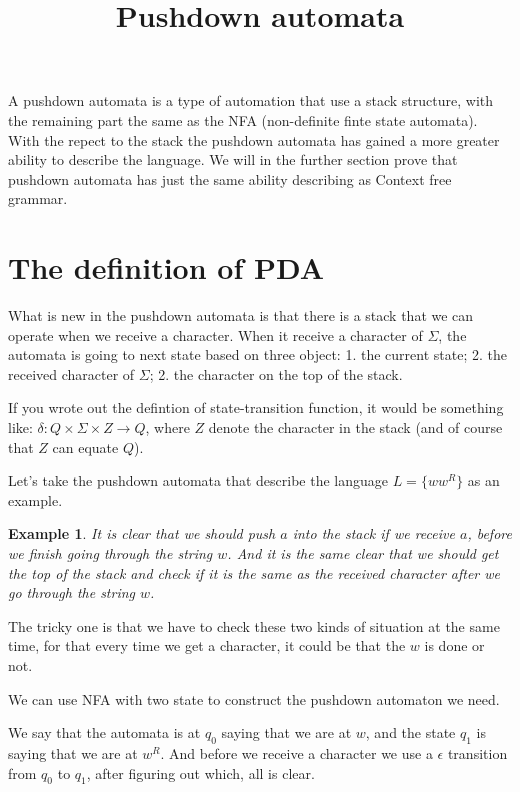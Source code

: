 \documentclass[12pt]{article}
\theoremstyle{definition}
\newtheorem{exam}[definition]{Example}
\theoremstyle{remark}
\begin{document}
\title{Pushdown automata}
\maketitle
A pushdown automata is a type of automation that use a stack structure, with the remaining part the same as the NFA (non-definite finte state automata). With the repect to the stack the pushdown automata has gained a more greater ability to describe the language. We will in the further section prove that pushdown automata has just the same ability describing as Context free grammar.

\section{The definition of PDA}
\label{sec:The definition of PDA}

What is new in the pushdown automata is that there is a stack that we can operate when we receive a character.
When it receive a character of \( \Sigma\), the automata is going to next state based on three object: 1. the current state; 2. the received character of \( \Sigma\); 2. the character on the top of the stack.

If you wrote out the defintion of state-transition function, it would be something like: \(\delta \colon Q \times \Sigma \times Z \to Q\), where \(Z\) denote the character in the stack (and of course that \(Z\) can equate \(Q\)).

Let's take the pushdown automata that describe the language \(L = \{ w w ^{R} \}\) as an example.

\begin{exam}
	{\sl
It is clear that we should push \(a\) into the stack if we receive \(a\), before we finish going through the string \(w\). And it is the same clear that we should get the top of the stack and check if it is the same as the received character after we go through the string \(w\).

The tricky one is that we have to check these two kinds of situation at the same time, for that every time we get a character, it could be that the \(w\) is done or not.

We can use NFA with two state to construct the pushdown automaton we need.

We say that the automata is at \(q_{0}\) saying that we are at \(w\), and the state \(q_1\) is saying that we are at \(w ^{R}\). And before we receive a character we use a \(\epsilon\) transition from \(q_{0}\) to \(q_1\),
after figuring out which, all is clear.
}
\begin{figure}
	\centering
{}
\end{figure}
\end{exam}
\end{document}

